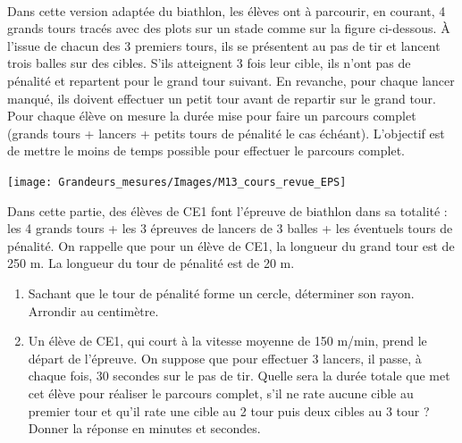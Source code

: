 {%
\activites

\begin{activite}
   \ \\ [-16mm]
   \begin{QCM}
      Dans cette version adaptée du biathlon, les élèves ont à parcourir, en courant, 4 grands tours tracés avec des plots sur un stade comme sur la figure ci-dessous. À l'issue de chacun des 3 premiers tours, ils se présentent au pas de tir et lancent trois balles sur des cibles. S'ils atteignent 3 fois leur cible, ils n'ont pas de pénalité et repartent pour le grand tour suivant. En revanche, pour chaque lancer manqué, ils doivent effectuer un petit tour avant de repartir sur le grand tour. \\
Pour chaque élève on mesure la durée mise pour faire un parcours complet (grands tours + lancers + petits tours de pénalité le cas échéant). L'objectif est de mettre le moins de temps possible pour effectuer le parcours complet.
      \begin{center}
         \texttt{[image: Grandeurs\_mesures/Images/M13\_cours\_revue\_EPS]}
      \end{center}
      Dans cette partie, des élèves de CE1 font l’épreuve de biathlon dans sa totalité : \\
      les 4 grands tours + les 3 épreuves de lancers de 3 balles + les éventuels tours de pénalité. On rappelle que pour un élève de CE1, la longueur du grand tour est de 250 m. La longueur du tour de pénalité est de 20 m.
      \begin{enumerate}
         \item Sachant que le tour de pénalité forme un cercle, déterminer son rayon. Arrondir au centimètre.
         \item Un élève de CE1, qui court à la vitesse moyenne de 150 m/min, prend le départ de l’épreuve. On suppose que pour effectuer 3 lancers, il passe, à chaque fois, 30 secondes sur le pas de tir. Quelle sera la durée totale que met cet élève pour réaliser le parcours complet, s’il ne rate aucune cible au premier tour et qu’il rate une cible au 2 tour puis deux cibles au 3 tour ? Donner la réponse en minutes et secondes.
      \end{enumerate}
   \end{QCM}
   
   \bigskip
   

\end{activite}}
